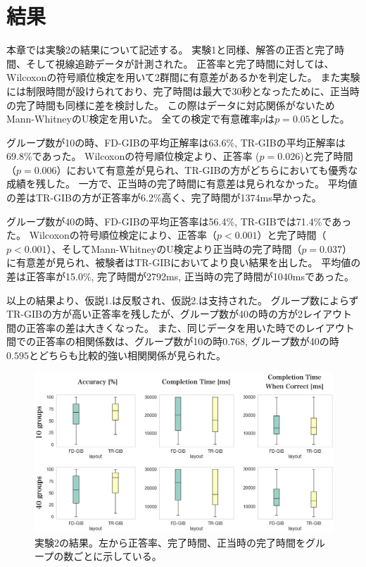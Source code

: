 \documentclass{kuee}
\begin{document}
\section{結果}
\label{sec:result-ex2}
本章では実験2の結果について記述する。
実験1と同様、解答の正否と完了時間、そして視線追跡データが計測された。
正答率と完了時間に対しては、Wilcoxonの符号順位検定を用いて2群間に有意差があるかを判定した。
また実験には制限時間が設けられており、完了時間は最大で30秒となったために、正当時の完了時間も同様に差を検討した。
この際はデータに対応関係がないためMann-WhitneyのU検定を用いた。
全ての検定で有意確率$p$は$p = 0.05$とした。

グループ数が10の時、FD-GIBの平均正解率は63.6\%, TR-GIBの平均正解率は69.8\%であった。
Wilcoxonの符号順位検定より、正答率 ($p=0.026$)と完了時間（$p=0.006$）において有意差が見られ、TR-GIBの方がどちらにおいても優秀な成績を残した。
一方で、正当時の完了時間に有意差は見られなかった。
平均値の差はTR-GIBの方が正答率が6.2\%高く、完了時間が1374ms早かった。

グループ数が40の時、FD-GIBの平均正答率は56.4\%, TR-GIBでは71.4\%であった。
Wilcoxonの符号順位検定により、正答率（$p<0.001$）と完了時間（$p < 0.001$）、そしてMann-WhitneyのU検定より正当時の完了時間（$p = 0.037$）に有意差が見られ、被験者はTR-GIBにおいてより良い結果を出した。
平均値の差は正答率が15.0\%, 完了時間が2792ms, 正当時の完了時間が1040msであった。

以上の結果より、仮説1.は反駁され、仮説2.は支持された。
グループ数によらずTR-GIBの方が高い正答率を残したが、グループ数が40の時の方が2レイアウト間の正答率の差は大きくなった。
また、同じデータを用いた時でのレイアウト間での正答率の相関係数は、グループ数が10の時$0.768$, グループ数が40の時$0.595$とどちらも比較的強い相関関係が見られた。

\begin{figure}[t]
  \begin{center}
  \includegraphics[width=15cm]{./images/ex2-result.png}
  \caption{実験2の結果。左から正答率、完了時間、正当時の完了時間をグループの数ごとに示している。}
  \label{fig:screenshot-ex2}
  \end{center}
\end{figure}
\end{document}
